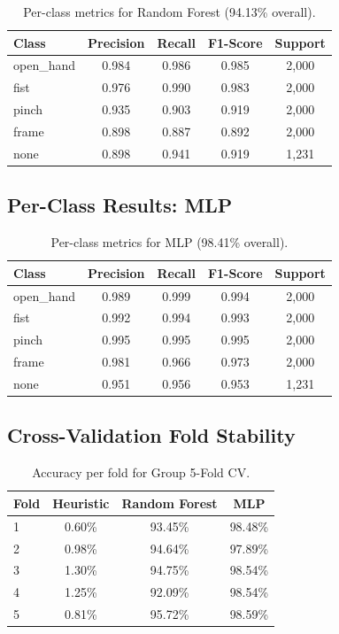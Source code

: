 \documentclass[11pt,a4paper]{article}
\begin{document}
\begin{table}[H]
\centering
\caption{Per-class metrics for Random Forest (94.13\% overall).}
\label{tab:rf-perclass}
\begin{tabular}{@{}lcccc@{}}
\toprule
\textbf{Class} & \textbf{Precision} & \textbf{Recall} & \textbf{F1-Score} & \textbf{Support} \\
\midrule
open\_hand & 0.984 & 0.986 & 0.985 & 2,000 \\
fist & 0.976 & 0.990 & 0.983 & 2,000 \\
pinch & 0.935 & 0.903 & 0.919 & 2,000 \\
frame & 0.898 & 0.887 & 0.892 & 2,000 \\
none & 0.898 & 0.941 & 0.919 & 1,231 \\
\bottomrule
\end{tabular}
\end{table}

\subsection{Per-Class Results: MLP}

\begin{table}[H]
\centering
\caption{Per-class metrics for MLP (98.41\% overall).}
\label{tab:mlp-perclass}
\begin{tabular}{@{}lcccc@{}}
\toprule
\textbf{Class} & \textbf{Precision} & \textbf{Recall} & \textbf{F1-Score} & \textbf{Support} \\
\midrule
open\_hand & 0.989 & 0.999 & 0.994 & 2,000 \\
fist & 0.992 & 0.994 & 0.993 & 2,000 \\
pinch & 0.995 & 0.995 & 0.995 & 2,000 \\
frame & 0.981 & 0.966 & 0.973 & 2,000 \\
none & 0.951 & 0.956 & 0.953 & 1,231 \\
\bottomrule
\end{tabular}
\end{table}

\subsection{Cross-Validation Fold Stability}

\begin{table}[H]
\centering
\caption{Accuracy per fold for Group 5-Fold CV.}
\label{tab:cv-folds}
\begin{tabular}{@{}lccc@{}}
\toprule
\textbf{Fold} & \textbf{Heuristic} & \textbf{Random Forest} & \textbf{MLP} \\
\midrule
1 & 0.60\% & 93.45\% & 98.48\% \\
2 & 0.98\% & 94.64\% & 97.89\% \\
3 & 1.30\% & 94.75\% & 98.54\% \\
4 & 1.25\% & 92.09\% & 98.54\% \\
5 & 0.81\% & 95.72\% & 98.59\% \\
\bottomrule
\end{tabular}
\end{table}
\end{document}
